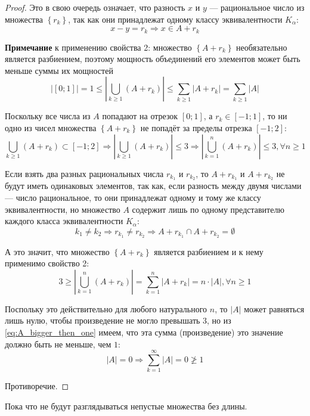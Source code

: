 \begin{proof}
    Это в свою очередь означает, что разность $x$ и $y$ --- рациональное число
    из множества $\left\{r_k\right\}$, так как они принадлежат
    одному классу эквивалентности $K_{\alpha}$:
           $$x-y=r_k\Rightarrow x\in A+r_k$$

    \textbf{Примечание} к применению свойства 2:
    множество $\left\{A+r_k\right\}$ необязательно является разбиением,
    поэтому мощность объединений его элементов
    может быть меньше суммы их мощностей
    \begin{equation}\label{eq:A_bigger_then_one}
        \left|\left[0;1\right]\right|=1
        \le\left|\bigcup_{k\ge 1} \left(A+r_k\right)\right|
        \le\sum_{k\ge 1} \left|A+r_k\right|
        =\sum_{k\ge 1} \left|A\right|
    \end{equation}
    
    Поскольку все числа из $A$ попадают на отрезок $\left[0;1\right]$,
    а $r_k\in\left[ -1;1\right]$,
    то ни одно из чисел множества $\left\{A+r_k\right\}$ не попадёт за пределы
    отрезка $\left[-1;2\right]$:
    $$\bigcup_{k\ge 1} \left(A+r_k\right)\subset\left[-1;2\right]
    \Rightarrow \left|\bigcup_{k\ge 1} \left(A+r_k\right)\right|\le 3
    \Rightarrow \left|\bigcup_{k=1}^n \left(A+r_k\right)\right|\le 3,
    \forall n\ge1$$
    
    Если взять два разных рациональных числа $r_{k_1}$ и $r_{k_2}$,
    то $A+r_{k_1}$ и $A+r_{k_2}$ не будут иметь одинаковых элементов,
    так как, если разность между двумя числами --- число рациональное,
    то они принадлежат одному и тому же классу эквивалентности,
    но множество $A$ содержит лишь по одному представителю
    каждого класса эквивалентности $K_{\alpha}$:
    $$k_1\neq k_2\Rightarrow
    r_{k_1}\neq r_{k_2}\Rightarrow
    A+r_{k_1} \cap A+r_{k_2} = \emptyset$$

    А это значит, что множество $\left\{A+r_k\right\}$ является разбиением
    и к нему применимо свойство 2:
    $$
    3\ge\left|\bigcup_{k=1}^n \left(A+r_k\right)\right|
    =\sum_{k=1}^n \left|A+r_k\right|
    =n\cdot\left|A\right|, \forall n\ge 1$$

    Поспольку это действительно для любого натурального $n$, то
    $\left|A\right|$ может равняться лишь нулю,
    чтобы произведение не могло превышать $3$,
    но из \eqref{eq:A_bigger_then_one} имеем,
    что эта сумма (произведение) это значение должно быть не меньше, чем $1$:
    $$\left|A\right|=0
    \Rightarrow \sum_{k=1}^\infty \left|A\right|=0\not\ge 1$$

    Противоречие.
\end{proof}
Пока что не будут разглядываться непустые множества без длины.
